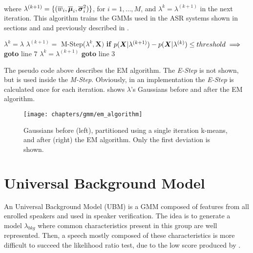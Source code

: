 \noindent\\ where $\lambda^{(k+1)} = \{(\overline{w}_i, \overline{\boldsymbol{\mu}}_i, \overline{\boldsymbol{\sigma}}_i^2)\}$, for $i = 1, \dots, M$, and $\lambda^{k} = \lambda^{(k+1)}$ in the next iteration. This algorithm trains the GMMs used in the ASR systems shown in sections  and  and previously described in .

\begin{algorithm}
\label{em-algorithm}
\begin{algorithmic}[1]
\State $\lambda^k = \lambda$
\State $\lambda^{(k+1)} =$ M-Step($\lambda^k, \boldsymbol{X})$
\State \textbf{if} $p(\boldsymbol{X}|\lambda^{(k+1)}) - p(\boldsymbol{X}|\lambda^{(k)}) \leq threshold \implies$ \textbf{goto} line $7$
\State$\lambda^k = \lambda^{(k+1)}$
\State \textbf{goto} line $3$
\EndProcedure
\end{algorithmic}
\end{algorithm}

\noindent The pseudo code above describes the EM algorithm. The \emph{E-Step} is not shown, but is used inside the \emph{M-Step}. Obviously, in an implementation the \emph{E-Step} is calculated once for each iteration.  shows $\lambda$'s Gaussians before and after the EM algorithm.

\begin{figure}[ht]
    \centering
    \texttt{[image: chapters/gmm/em\_algorithm]}
    \caption{Gaussians before (left), partitioned using a single iteration k-means, and after (right) the EM algorithm. Only the first deviation is shown.}
    \label{fig:em_algorithm}
\end{figure}

\section{Universal Background Model}
\label{sec:ubm}

An Universal Background Model (UBM) is a GMM composed of features from all enrolled speakers and used in speaker verification. The idea is to generate a model $\lambda_{bkg}$ where common characteristics present in this group are well represented. Then, a speech mostly composed of these characteristics is more difficult to succeed the likelihood ratio test, due to the low score produced by .

